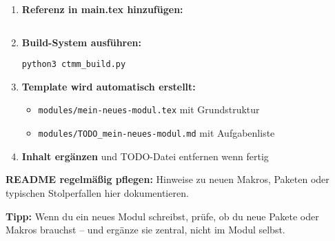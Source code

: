 \begin{enumerate}
\def\labelenumi{\arabic{enumi}.}
\tightlist
\item
  \textbf{Referenz in main.tex hinzufügen:}
\begin{verbatim}

\end{verbatim}
\item
  \textbf{Build-System ausführen:}
\begin{verbatim}
python3 ctmm_build.py
\end{verbatim}
\item
  \textbf{Template wird automatisch erstellt:}
  \begin{itemize}
  \tightlist
  \item
    \texttt{modules/mein-neues-modul.tex} mit Grundstruktur
  \item
    \texttt{modules/TODO\_mein-neues-modul.md} mit Aufgabenliste
  \end{itemize}
\item
  \textbf{Inhalt ergänzen} und TODO-Datei entfernen wenn fertig
\end{enumerate}

\textbf{README regelmäßig pflegen:}
Hinweise zu neuen Makros, Paketen oder typischen Stolperfallen hier dokumentieren.

\textbf{Tipp:}
Wenn du ein neues Modul schreibst, prüfe, ob du neue Pakete oder Makros brauchst -- und ergänze sie zentral, nicht im Modul selbst.